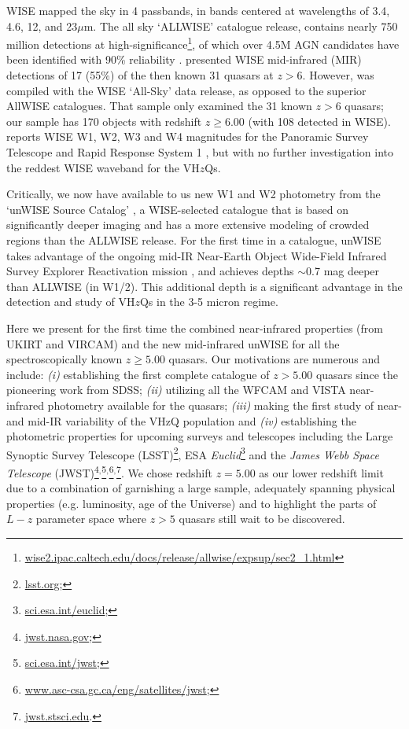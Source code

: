 \documentclass[usenatbib]{mnras}
\begin{document}
WISE mapped the sky in 4 passbands, in bands centered at wavelengths
of 3.4, 4.6, 12, and 23$\mu$m. The all sky `ALLWISE' catalogue
release, contains nearly 750 million detections at
high-significance\footnote{\href{wise2.ipac.caltech.edu/docs/release/allwise/expsup/sec2\_1.html}{wise2.ipac.caltech.edu/docs/release/allwise/expsup/sec2\_1.html}},
of which over 4.5M AGN candidates have been identified with 90\%
reliability \citep{Assef2018}.  \citet{Blain2013} presented WISE
mid-infrared (MIR) detections of 17 (55\%) of the then known 31
quasars at $z > 6$. However, \citet{Blain2013} was compiled with the
WISE `All-Sky' data release, as opposed to the superior AllWISE
catalogues. That sample only examined the 31 known $z>6$ quasars; our
sample has 170 objects with redshift $z \geq 6.00$ (with 108 detected
in WISE). \citet{Banados2016} reports WISE W1, W2, W3 and W4
magnitudes for the Panoramic Survey Telescope and Rapid Response
System 1 \citep[Pan-STARRS1, PS1;][]{Kaiser2002, Kaiser2010}, but with
no further investigation into the reddest WISE waveband for the
VH$z$Qs.

Critically, we now have available to us new W1 and W2 photometry from the `unWISE Source Catalog' \citep[][]{Schlafly2019}, a WISE-selected catalogue that is based on significantly deeper imaging and has a more extensive modeling of crowded regions than the ALLWISE release. For the first time in a catalogue, unWISE takes advantage of the ongoing mid-IR Near-Earth Object Wide-Field Infrared Survey Explorer Reactivation mission \citep[NEOWISE-R; ][]{Mainzer2014}, and achieves depths $\sim$0.7 mag deeper than ALLWISE (in W1/2).  This additional depth is a significant advantage in the detection and study of VH$z$Qs in the 3-5 micron regime.

Here we present for the first time the combined near-infrared
properties (from UKIRT and VIRCAM) and the new mid-infrared unWISE for
all the spectroscopically known $z\geq5.00$ quasars. Our motivations
are numerous and include: {\it (i)} establishing the first complete
catalogue of $z>5.00$ quasars since the pioneering work from SDSS;
{\it (ii)} utilizing all the WFCAM and VISTA near-infrared photometry
available for the quasars; {\it (iii)} making the first study of near-
and mid-IR variability of the VHzQ population and {\it (iv)}
establishing the photometric properties for upcoming surveys and
telescopes including the Large Synoptic Survey Telescope
(LSST)\blindtext\footnote{\href{https://www.lsst.org}{lsst.org};}, ESA {\it
Euclid}\footnote{\href{https://sci.esa.int/euclid/}{sci.esa.int/euclid};}
and the {\it James Webb Space Telescope}
(JWST)\footnote{\href{https://www.jwst.nasa.gov/}{jwst.nasa.gov};}$^,$\footnote{\href{https://sci.esa.int/jwst/}{sci.esa.int/jwst};}$^,$\footnote{\href{https://www.asc-csa.gc.ca/eng/satellites/jwst/}{www.asc-csa.gc.ca/eng/satellites/jwst};}$^,$\footnote{\href{https://jwst.stsci.edu/}{jwst.stsci.edu}.}. We
chose redshift $z=5.00$ as our lower redshift limit due to a
combination of garnishing a large sample, adequately spanning physical
properties (e.g. luminosity, age of the Universe) and to highlight the
parts of $L-z$ parameter space where $z>5$ quasars still wait to be
discovered.
\end{document}
